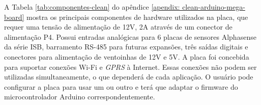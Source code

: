 A Tabela \ref{tab:componentes-clean} do apêndice \ref{apendix: clean-arduino-mega-board} mostra os principais componentes de hardware utilizados na placa, que requer uma tensão de alimentação de 12V, 2A através de um conector de alimentação P4. Possui entradas analógicas para 6 placas de sensores Alphasense da série ISB, barramento RS-485 para futuras expansões, três saídas digitais e conectores para alimentação de ventoinhas de 12V e 5V. A placa foi concebida para suportar conexões Wi-Fi e \textit{GPRS} à Internet. Essas conexões não podem ser utilizadas simultaneamente, o que dependerá de cada aplicação. O usuário pode configurar a placa para usar um ou outro e terá que adaptar o firmware do microcontrolador Arduino correspondentemente.

